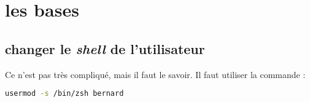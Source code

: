 \section{les bases}
\subsection{changer le \emph{shell} de l'utilisateur}
Ce n'est pas très compliqué, mais il faut le savoir. Il faut utiliser la commande  :

\begin{lstlisting}[language=sh, frame=single, caption=changer le shell par défaut]
usermod -s /bin/zsh bernard
\end{lstlisting}

